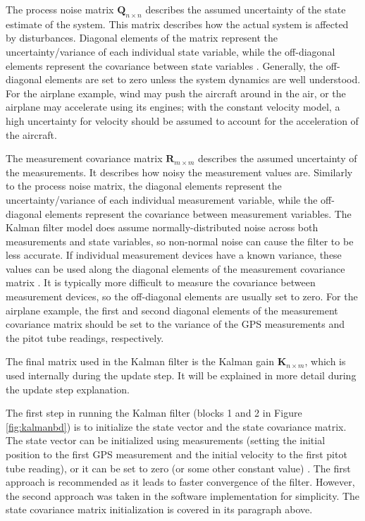 \documentclass[11pt]{ucthesisCP}
\begin{document}
The process noise matrix \(\mathbf{Q}_{n \times n}\) describes the assumed uncertainty of the state estimate of the system. This matrix describes how the actual system is affected by disturbances. Diagonal elements of the matrix represent the uncertainty/variance of each individual state variable, while the off-diagonal elements represent the covariance between state variables \cite{kfsimply}. Generally, the off-diagonal elements are set to zero unless the system dynamics are well understood. For the airplane example, wind may push the aircraft around in the air, or the airplane may accelerate using its engines; with the constant velocity model, a high uncertainty for velocity should be assumed to account for the acceleration of the aircraft. 

The measurement covariance matrix \(\mathbf{R}_{m \times m}\) describes the assumed uncertainty of the measurements. It describes how noisy the measurement values are. Similarly to the process noise matrix, the diagonal elements represent the uncertainty/variance of each individual measurement variable, while the off-diagonal elements represent the covariance between measurement variables. The Kalman filter model does assume normally-distributed noise across both measurements and state variables, so non-normal noise can cause the filter to be less accurate. If individual measurement devices have a known variance, these values can be used along the diagonal elements of the measurement covariance matrix \cite{kfsimply}. It is typically more difficult to measure the covariance between measurement devices, so the off-diagonal elements are usually set to zero. For the airplane example, the first and second diagonal elements of the measurement covariance matrix should be set to the variance of the GPS measurements and the pitot tube readings, respectively.

The final matrix used in the Kalman filter is the Kalman gain \(\mathbf{K}_{n \times m}\), which is used internally during the update step. It will be explained in more detail during the update step explanation.

The first step in running the Kalman filter (blocks 1 and 2 in Figure \ref{fig:kalmanbd}) is to initialize the state vector and the state covariance matrix. The state vector can be initialized using measurements (setting the initial position to the first GPS measurement and the initial velocity to the first pitot tube reading), or it can be set to zero (or some other constant value) \cite{kfsimply}. The first approach is recommended as it leads to faster convergence of the filter. However, the second approach was taken in the software implementation for simplicity. The state covariance matrix initialization is covered in its paragraph above.
\end{document}
